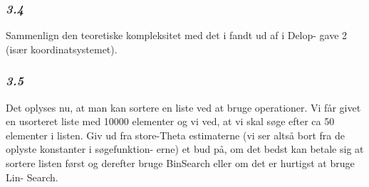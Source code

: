 \documentclass{article}
\begin{document}
\begin{Maple Normal}{
}\end{Maple Normal}
\subsubsection{\textbf{\textit{3.4}}}
\begin{Maple Normal}{
 Sammenlign den teoretiske kompleksitet med det i fandt ud af i Delop-\linebreak
gave 2 (især koordinatsystemet).\linebreak
}\end{Maple Normal}

\begin{Maple Normal}{
}\end{Maple Normal}
\begin{Maple Normal}{
}\end{Maple Normal}
\begin{Maple Normal}{
}\end{Maple Normal}
\mapleresult
{}
\begin{Maple Normal}{
}\end{Maple Normal}
\mapleresult
{}
\begin{Maple Normal}{
}\end{Maple Normal}
\begin{Maple Normal}{
}\end{Maple Normal}
\subsubsection{\textbf{\textit{3.5}}}
\begin{Maple Normal}{
Det oplyses nu, at man kan sortere en liste ved at bruge 
\linebreak
operationer. Vi får givet en usorteret liste med 10000 elementer og vi\linebreak
ved, at vi skal søge efter ca 50 elementer i listen. Giv ud fra store-Theta\linebreak
estimaterne (vi ser altså bort fra de oplyste konstanter i søgefunktion-\linebreak
erne) et bud på, om det bedst kan betale sig at sortere listen først\linebreak
og derefter bruge BinSearch eller om det er hurtigst at bruge Lin-\linebreak
Search.\linebreak
}\end{Maple Normal}
\end{document}

